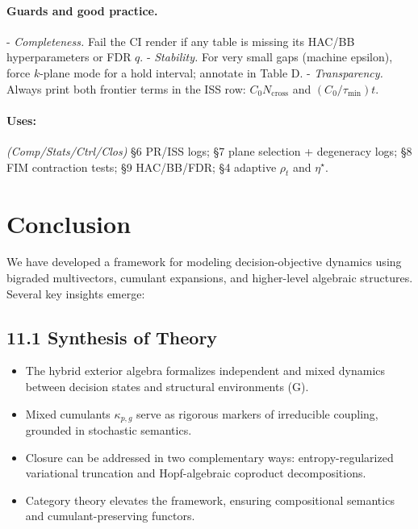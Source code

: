 \documentclass[10pt]{article}
\begin{document}
\paragraph{Guards and good practice.}
- \emph{Completeness.} Fail the CI render if any table is missing its HAC/BB hyperparameters or FDR $q$.  
- \emph{Stability.} For very small gaps (machine epsilon), force $k$-plane mode for a hold interval; annotate in Table D.  
- \emph{Transparency.} Always print both frontier terms in the ISS row: $C_0 N_{\mathrm{cross}}$ and $(C_0/\tau_{\min})t$.

\paragraph{Uses:} \textit{(Comp/Stats/Ctrl/Clos)} §6 PR/ISS logs; §7 plane selection + degeneracy logs; §8 FIM contraction tests; §9 HAC/BB/FDR; §4 adaptive $\rho_t$ and $\eta^\star$.


\section{Conclusion}\label{sec:conclusion}

We have developed a framework for modeling decision-objective dynamics using bigraded multivectors, cumulant expansions, and higher-level algebraic structures. Several key insights emerge:

\subsection*{11.1 \quad Synthesis of Theory}
\begin{itemize}
    \item The hybrid exterior algebra formalizes independent and mixed dynamics between decision states and structural environments (G).
    \item Mixed cumulants $\kappa_{p,g}$ serve as rigorous markers of irreducible coupling, grounded in stochastic semantics.
    \item Closure can be addressed in two complementary ways: entropy-regularized variational truncation and Hopf-algebraic coproduct decompositions.
    \item Category theory elevates the framework, ensuring compositional semantics and cumulant-preserving functors.
\end{itemize}
\end{document}
